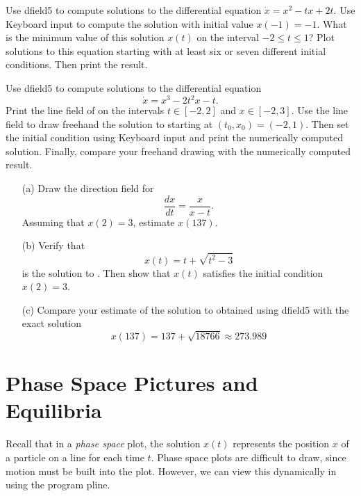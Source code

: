 \begin{exercise} \label{c3.2.2}
Use {\sf dfield5} to compute solutions to the differential equation
$\dot{x} = x^2-tx+2t$. Use {\sf Keyboard input} to compute the solution
with initial value $x(-1)=-1$.  What is the minimum value of this
solution $x(t)$ on the interval $-2\leq t\leq 1$?  Plot
solutions to this equation starting with at least six or seven
different initial conditions. Then print the result.
\end{exercise}

\begin{exercise} \label{c3.2.3}
Use {\sf dfield5} to compute solutions to the differential
equation
\begin{equation}  \label{E:freehand}
\dot{x} = x^3-2t^2x-t.
\end{equation}
Print the line field of  on the intervals
$t\in[-2,2]$ and $x\in[-2,3]$.  Use the line field to draw freehand
the solution to  starting at $(t_0,x_0)=(-2,1)$.
Then set the initial condition using {\sf Keyboard input}
and print the numerically computed solution. Finally, compare
your freehand drawing with the numerically computed result.
\end{exercise}

\begin{exercise}  \label{exer:at}
\begin{itemize}
\item[(a)]  Draw the direction field for
\begin{equation} \label{ex:at}
\frac{dx}{dt} = \frac{x}{x-t}.
\end{equation}
Assuming that $x(2)=3$, estimate $x(137)$.
\item[(b)]  Verify that
\[
x(t) = t + \sqrt{t^2-3}
\]
is the solution to .  Then show that $x(t)$ satisfies the
initial condition $x(2)=3$.
\item[(c)]  Compare your estimate of the solution to 
obtained using {\sf dfield5} with the exact solution
\[
x(137)= 137 +\sqrt{18766} \approx 273.989
\]
\end{itemize}
\end{exercise}

\section{Phase Space Pictures and Equilibria} \label{S:PSP&E}

Recall that in a {\em phase space\/}  plot, the 
solution $x(t)$ represents the position $x$ of a particle on a line 
for each time $t$.  Phase space plots are difficult to draw, since 
motion must be built into the plot.  However, we can view this 
dynamically in \Matlab using the program {\sf pline}. 

